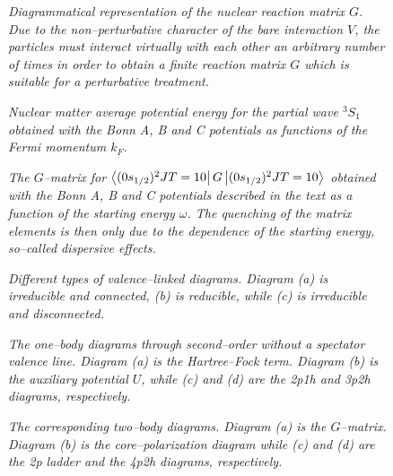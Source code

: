 


\clearpage
\begin{figure}[hbtp]
\vspace{15cm}
\caption{{\em Diagrammatical representation of the nuclear reaction
matrix $G$. Due to the non--perturbative character of the bare interaction $V$,
the particles must interact virtually with each other an arbitrary number of times
in order to obtain a finite reaction matrix $G$ which is suitable for
a perturbative treatment.}}\label{fig:gmat}
\end{figure}
\clearpage
\begin{figure}[hbpt]
\vspace{15cm}
\caption{{\em Nuclear matter average potential energy for the partial wave
$^{3}S_1$ obtained with the Bonn A, B and C potentials as functions of
the Fermi momentum $k_F$.}}
\label{fig:bhfnm}
\end{figure}
\clearpage
\begin{figure}[hbtp]
\vspace{15cm}
\caption{{\em The $G$--matrix for
$\left\langle (0s_{1/2})^{2}JT=10 \right|G\left| (0s_{1/2})^{2}JT=10 \right\rangle$ obtained
with the Bonn A, B and C potentials described in the text as a function
of the
starting energy $\omega$. The quenching of the matrix elements
is then only due to the dependence
of the starting energy, so--called dispersive effects.}}
\label{fig:0s0s}
\end{figure}
\clearpage
\begin{figure}[hbtp]
\vspace{15cm}
\caption{{\em Different types of valence--linked diagrams. Diagram (a)
is irreducible and connected, (b) is reducible, while (c) is irreducible
and disconnected.}}
\label{fig:diags}
\end{figure}
\clearpage
\begin{figure}[hbtp]
\vspace{15cm}
\caption{{\em The one--body diagrams through second--order
without a spectator valence line.
Diagram (a) is  the Hartree--Fock
term. Diagram (b) is the auxiliary potential $U$,
while (c) and (d) are the 2p1h and 3p2h
diagrams, respectively.}}
\label{fig:onebody}
\end{figure}
\clearpage
\begin{figure}[hbtp]
\vspace{15cm}
\caption{{\em The corresponding two--body diagrams.
Diagram (a) is the $G$--matrix. Diagram (b) is the core--polarization
diagram
while (c) and (d) are the 2p ladder and the
4p2h diagrams, respectively.}}
\label{fig:twobody}
\end{figure}
\clearpage

